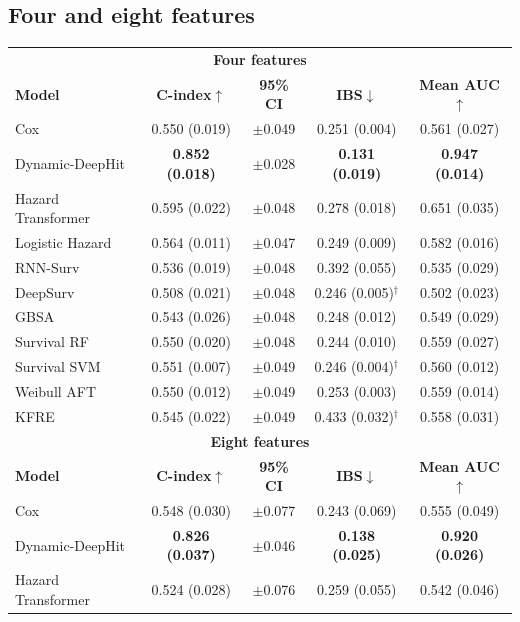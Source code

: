 \documentclass[10pt,letterpaper]{article}
\begin{document}
\subsection*{Four and eight features}

\begin{table}[h!]
\centering
\footnotesize
\setlength{\tabcolsep}{3pt}
\begin{tabular}{@{}lcccc@{}}
\toprule
\multicolumn{5}{c}{\textbf{Four features}} \\
\textbf{Model} & \textbf{C-index}$\uparrow$ & \textbf{95\% CI} & \textbf{IBS}$\downarrow$ & \textbf{Mean AUC}$\uparrow$ \\
\midrule
Cox & 0.550 (0.019) & $\pm$0.049 & 0.251 (0.004) & 0.561 (0.027) \\
Dynamic-DeepHit & \textbf{0.852 (0.018)} & $\pm$0.028 & \textbf{0.131 (0.019)} & \textbf{0.947 (0.014)} \\
Hazard Transformer & 0.595 (0.022) & $\pm$0.048 & 0.278 (0.018) & 0.651 (0.035) \\
Logistic Hazard & 0.564 (0.011) & $\pm$0.047 & 0.249 (0.009) & 0.582 (0.016) \\
RNN-Surv & 0.536 (0.019) & $\pm$0.048 & 0.392 (0.055) & 0.535 (0.029) \\
DeepSurv & 0.508 (0.021) & $\pm$0.048 & 0.246 (0.005)$^{\dagger}$ & 0.502 (0.023) \\
GBSA & 0.543 (0.026) & $\pm$0.048 & 0.248 (0.012) & 0.549 (0.029) \\
Survival RF & 0.550 (0.020) & $\pm$0.048 & 0.244 (0.010) & 0.559 (0.027) \\
Survival SVM & 0.551 (0.007) & $\pm$0.049 & 0.246 (0.004)$^{\dagger}$ & 0.560 (0.012) \\
Weibull AFT & 0.550 (0.012) & $\pm$0.049 & 0.253 (0.003) & 0.559 (0.014) \\
KFRE & 0.545 (0.022) & $\pm$0.049 & 0.433 (0.032)$^{\dagger}$ & 0.558 (0.031) \\
\midrule
\multicolumn{5}{c}{\textbf{Eight features}} \\
\textbf{Model} & \textbf{C-index}$\uparrow$ & \textbf{95\% CI} & \textbf{IBS}$\downarrow$ & \textbf{Mean AUC}$\uparrow$ \\
\midrule
Cox & 0.548 (0.030) & $\pm$0.077 & 0.243 (0.069) & 0.555 (0.049) \\
Dynamic-DeepHit & \textbf{0.826 (0.037)} & $\pm$0.046 & \textbf{0.138 (0.025)} & \textbf{0.920 (0.026)} \\
Hazard Transformer & 0.524 (0.028) & $\pm$0.076 & 0.259 (0.055) & 0.542 (0.046) \\

\end{tabular}
\end{table}
\end{document}

